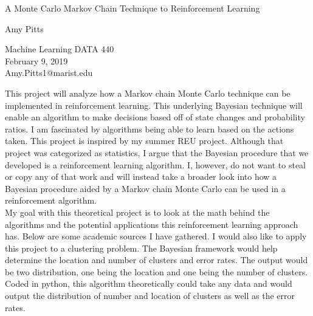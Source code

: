 \documentclass[a4paper]{article}
\begin{document}

\Large
 \begin{center}
A Monte Carlo Markov Chain Technique to Reinforcement Learning
\hspace{10pt}

\large
Amy Pitts
\\

\hspace{10pt}

\small 
Machine Learning DATA 440 \\ 
February 9, 2019 \\
Amy.Pitts1@marist.edu\\

\end{center}

\hspace{10pt}

\normalsize

\indent This project will analyze how a Markov chain Monte Carlo
technique can be implemented in reinforcement learning. This 
underlying Bayesian technique will enable an algorithm to make 
decisions based off of state changes and probability ratios.  
I am fascinated by algorithms being able to learn based on the 
actions taken. This project is inspired by my summer REU project. 
Although that project was categorized as statistics, I argue that
the Bayesian procedure that we developed is a reinforcement 
learning algorithm.  I, however, do not want to steal or copy 
any of that work and will instead take a broader look into how a 
Bayesian procedure aided by a Markov chain Monte Carlo can be 
used in a reinforcement algorithm. \\ 
\indent My goal with this theoretical project is to look at the 
math behind the algorithms and the potential applications this 
reinforcement learning approach has.  Below are some academic 
sources I have gathered. I would also like to apply this project 
to a clustering problem. The Bayesian framework would help 
determine the location and number of clusters and error rates.  
The output would be two distribution, one being the location 
and one being the number of clusters. Coded in python, this 
algorithm theoretically could take any data and would output 
the distribution of number and location of clusters as well 
as the error rates. 
\end{document}
